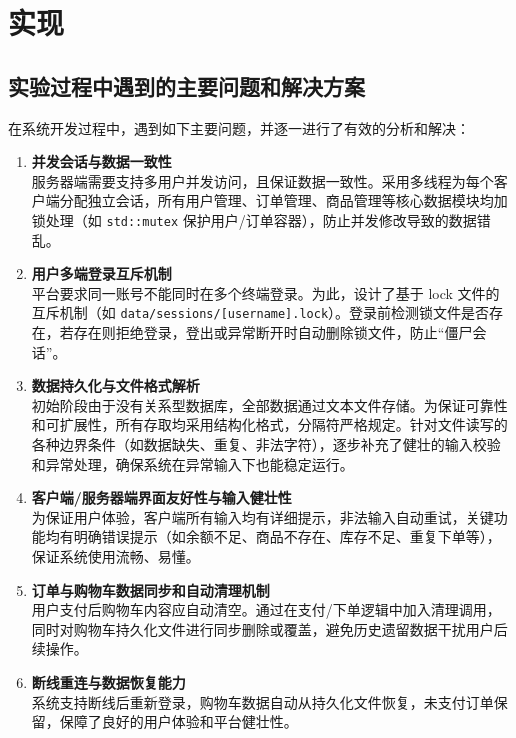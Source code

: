 \documentclass[11pt]{article}
\begin{document}
\newpage
\section{实现}

\subsection{实验过程中遇到的主要问题和解决方案}

在系统开发过程中，遇到如下主要问题，并逐一进行了有效的分析和解决：

\begin{enumerate}
    \item \textbf{并发会话与数据一致性} \\
    服务器端需要支持多用户并发访问，且保证数据一致性。采用多线程为每个客户端分配独立会话，所有用户管理、订单管理、商品管理等核心数据模块均加锁处理（如 \texttt{std::mutex} 保护用户/订单容器），防止并发修改导致的数据错乱。

    \item \textbf{用户多端登录互斥机制} \\
    平台要求同一账号不能同时在多个终端登录。为此，设计了基于 lock 文件的互斥机制（如 \texttt{data/sessions/[username].lock}）。登录前检测锁文件是否存在，若存在则拒绝登录，登出或异常断开时自动删除锁文件，防止“僵尸会话”。

    \item \textbf{数据持久化与文件格式解析} \\
    初始阶段由于没有关系型数据库，全部数据通过文本文件存储。为保证可靠性和可扩展性，所有存取均采用结构化格式，分隔符严格规定。针对文件读写的各种边界条件（如数据缺失、重复、非法字符），逐步补充了健壮的输入校验和异常处理，确保系统在异常输入下也能稳定运行。

    \item \textbf{客户端/服务器端界面友好性与输入健壮性} \\
    为保证用户体验，客户端所有输入均有详细提示，非法输入自动重试，关键功能均有明确错误提示（如余额不足、商品不存在、库存不足、重复下单等），保证系统使用流畅、易懂。

    \item \textbf{订单与购物车数据同步和自动清理机制} \\
    用户支付后购物车内容应自动清空。通过在支付/下单逻辑中加入清理调用，同时对购物车持久化文件进行同步删除或覆盖，避免历史遗留数据干扰用户后续操作。

    \item \textbf{断线重连与数据恢复能力} \\
    系统支持断线后重新登录，购物车数据自动从持久化文件恢复，未支付订单保留，保障了良好的用户体验和平台健壮性。
\end{enumerate}
\end{document}
